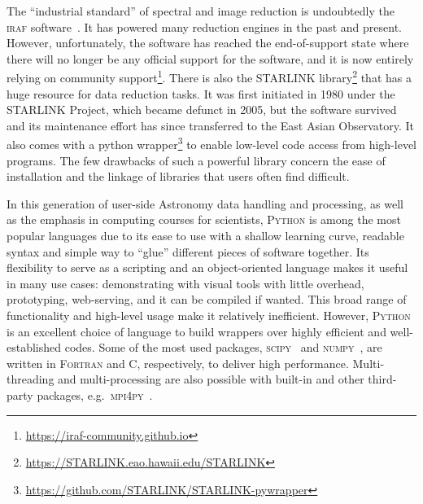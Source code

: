 \documentclass[linenumbers, twocolumn]{aastex631}
\begin{document}
The ``industrial standard'' of spectral and image reduction is undoubtedly
the \textsc{iraf} software~\citep{1986SPIE..627..733T, 1993ASPC...52..173T}.
It has powered many reduction engines in the past and present. However,
unfortunately, the software has reached the end-of-support state where there
will no longer be any official support for the software, and it is now
entirely relying on community support\footnote{\url{https://iraf-community.github.io}}.
There is also the \textsc{STARLINK}
library\footnote{\url{https://STARLINK.eao.hawaii.edu/STARLINK}}\citep{2014ASPC..485..391C, 2022ASPC..532..559B}
that has a huge resource for data reduction tasks. It was first initiated
in 1980 under the STARLINK Project, which became defunct in 2005, but the
software survived and its maintenance effort has since transferred to the
East Asian Observatory. It also comes with a python
wrapper\footnote{\url{https://github.com/STARLINK/STARLINK-pywrapper}}
to enable low-level code access from high-level programs. The few drawbacks
of such a powerful library concern the ease of installation and the
linkage of libraries that users often find difficult.

In this generation of user-side Astronomy data handling and processing, as
well as the emphasis in computing courses for scientists, \textsc{Python} is
among the most popular languages due to its ease to use with a shallow learning
curve, readable syntax and simple way to ``glue'' different pieces of software
together. Its flexibility to serve as a scripting and an object-oriented
language makes it useful in many use cases: demonstrating with visual tools
with little overhead, prototyping, web-serving, and it can be compiled if
wanted. This broad range of functionality and high-level usage make it
relatively inefficient. However, \textsc{Python} is an excellent choice of
language to build wrappers over highly efficient and well-established codes.
Some of the most used packages, \textsc{scipy}~\citep{2020SciPy-NMeth}
and \textsc{numpy}~\citep{2020NumPy-Array}, are written in \textsc{Fortran}
and \textsc{C}, respectively, to deliver high performance. Multi-threading
and multi-processing are also possible with built-in and other third-party
packages, e.g.\ \textsc{mpi4py}~\citep{DALCIN20111124}. 
\end{document}
